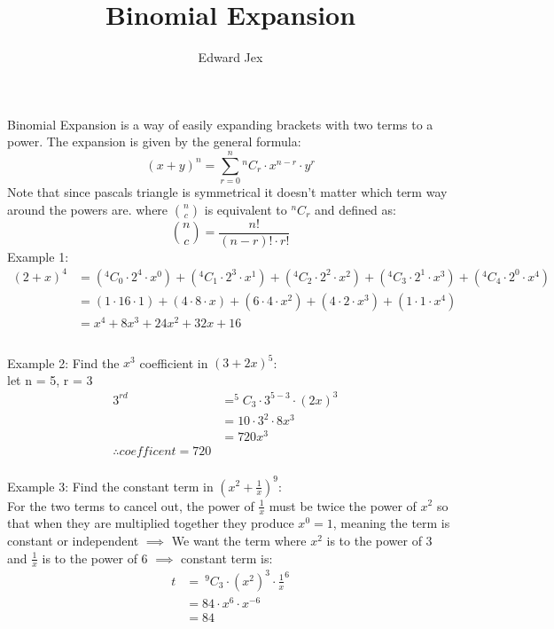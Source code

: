 \documentclass[a4paper,12pt,fleqn]{article}
\begin{document}
\title{Binomial Expansion}	
\author{Edward Jex}
\maketitle

Binomial Expansion is a way of easily expanding brackets with two terms to a power. The expansion is given by the general formula: 
\begin{equation*}
(x + y)^n = \sum_{r=0}^{n} ^nC_r \cdot x^{n-r} \cdot y^r
\end{equation*}
Note that since pascals triangle is symmetrical it doesn't matter which term way around the powers are. 
where $\binom{n}{c}$ is equivalent to $^nC_r$ and defined as:
\begin{equation*}
\binom{n}{c} = \frac{n!}{(n-r)! \cdot r!}
\end{equation*}
Example 1:
\begin{align*}
(2 + x)^4  & =
  (^4C_0 \cdot 2^4 \cdot x^0) 
+ (^4C_1 \cdot 2^3 \cdot x^1) 
+ (^4C_2 \cdot 2^2 \cdot x^2) 
+ (^4C_3 \cdot 2^1 \cdot x^3) 
+ (^4C_4 \cdot 2^0 \cdot x^4)&\\
& =
  (1 \cdot 16 \cdot 1) 
+ (4 \cdot 8 \cdot x) 
+ (6 \cdot 4 \cdot x^2) 
+ (4 \cdot 2 \cdot x^3)
+ (1 \cdot 1 \cdot x^4)&\\
& = x^4 + 8x^3 + 24x^2 + 32x + 16&\\
\end{align*}
\\
Example 2:
Find the $x^3$ coefficient in $(3 + 2x)^5$:
\\
let n = 5, r = 3
\begin{align*}
3^{rd}\; & = ^5C_3 \cdot 3^{5-3} \cdot (2x)^3 &\\
 & = 10 \cdot 3^2 \cdot 8x^3 &\\
 & = 720x^3 &\\
\therefore coefficent = 720
\end{align*}
\\
Example 3:
Find the constant term in $(x^2 + \frac{1}{x})^9$:\\
For the two terms to cancel out, the power of $\frac{1}{x}$ must be twice the power of $x^2$ so that when they are multiplied together they produce $x^0 = 1$, meaning the term is constant or independent $\implies$ We want the term where $x^2$ is to the power of 3 and $\frac{1}{x}$ is to the power of 6 $\implies$ constant term is:
\begin{align*}
t & = \: ^9C_3 \cdot (x^2)^3 \cdot \frac{1}{x}^6\\
  & = 84 \cdot x^6 \cdot x^{-6}\\
  & = 84
\end{align*}
\end{document}
